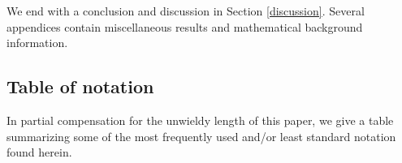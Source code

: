 We end with a conclusion and discussion in Section \ref{discussion}. 
Several appendices contain miscellaneous results and mathematical background information. 


%








\subsection{Table of notation}

In partial compensation for the unwieldy length of this paper, we give a table summarizing some of the 
most frequently used and/or least standard notation found herein.


\medskip

